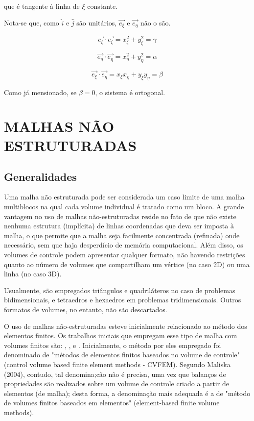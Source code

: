que é tangente à linha de $\xi$ constante.

Nota-se que, como $\hat{i}$ e $\hat{j}$ são unitários, $\vec{e_\xi}$ e $\vec{e_\eta}$ não o são.

\begin{equation}
    \label{eq:2.26}
    \vec{e_\xi} \cdot \vec{e_\xi} = x_\xi^2 + y_\xi^2 = \gamma
\end{equation}

\begin{equation}
    \label{eq:2.27}
    \vec{e_\eta} \cdot \vec{e_\eta} = x_\eta^2 + y_\eta^2 = \alpha
\end{equation}

\begin{equation}
    \label{eq:2.28}
    \vec{e_\xi} \cdot \vec{e_\eta} = x_\xi x_\eta + y_\xi y_\eta = \beta
\end{equation}

Como já mensionado, se $\beta = 0$, o sistema é ortogonal.

\chapter[MALHAS NÃO ESTRUTURADAS]{MALHAS NÃO ESTRUTURADAS}

\section{Generalidades}

Uma malha não estruturada pode ser considerada um caso limite de uma malha multiblocos na qual cada volume individual é tratado como um bloco. A grande vantagem no uso de malhas não-estruturadas reside no fato de que não existe nenhuma estrutura (implícita) de linhas coordenadas que deva ser imposta à malha, o que permite que a malha seja facilmente concentrada (refinada) onde necessário, sem que haja desperdício de memória computacional. Além disso, os volumes de controle podem apresentar qualquer formato, não havendo restrições quanto ao número de volumes que compartilham um vértice (no caso 2D) ou uma linha (no caso 3D).

Usualmente, são empregados triângulos e quadriláteros no caso de problemas bidimensionais, e tetraedros e hexaedros em problemas tridimensionais. Outros formatos de volumes, no entanto, não são descartados.

O uso de malhas não-estruturadas esteve inicialmente relacionado ao método dos elementos finitos. Os trabalhos iniciais que empregam esse tipo de malha com volumes finitos são: \cite{winslow1966numerical}, \cite{baliga1980new}, \cite{baliga1983solution} e \cite{eiser1985trying}. Inicialmente, o método por eles empregado foi denominado de "métodos de elementos finitos baseados no volume de controle"(control volume based finite element methods - CVFEM). Segundo Maliska (2004), contudo, tal denomina;cão não é precisa, uma vez que balanços de propriedades são realizados sobre um volume de controle criado a partir de elementos (de malha); desta forma, a denominação mais adequada é a de "método de volumes finitos baseados em elementos" (element-based finite volume methods).

